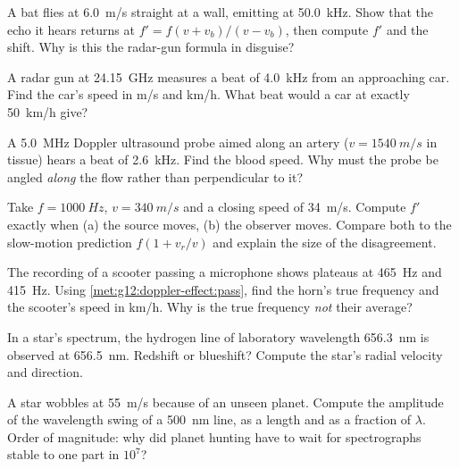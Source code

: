 \begin{exercise}[$\star\star$]\label{exo:g12:doppler-effect:6}
A bat flies at \qty{6.0}{m/s} straight at a wall, emitting at \qty{50.0}{kHz}. Show that
the echo it hears returns at $f' = f(v + v_b)/(v - v_b)$, then compute $f'$ and the shift.
Why is this the radar-gun formula in disguise?
\end{exercise}

\begin{exercise}[$\star\star$]\label{exo:g12:doppler-effect:7}
A radar gun at \qty{24.15}{GHz} measures a beat of \qty{4.0}{kHz} from an approaching car.
Find the car's speed in \unit{m/s} and \unit{km/h}. What beat would a car at exactly
\qty{50}{km/h} give?
\end{exercise}

\begin{exercise}[$\star\star$]\label{exo:g12:doppler-effect:8}
A \qty{5.0}{MHz} Doppler ultrasound probe aimed along an artery ($v = \qty{1540}{m/s}$ in
tissue) hears a beat of \qty{2.6}{kHz}. Find the blood speed. Why must the probe be angled
\emph{along} the flow rather than perpendicular to it?
\end{exercise}

\begin{exercise}[$\star\star$]\label{exo:g12:doppler-effect:9}
Take $f = \qty{1000}{Hz}$, $v = \qty{340}{m/s}$ and a closing speed of \qty{34}{m/s}.
Compute $f'$ exactly when (a) the source moves, (b) the observer moves. Compare both to
the slow-motion prediction $f(1 + v_r/v)$ and explain the size of the disagreement.
\end{exercise}

\begin{exercise}[$\star\star$]\label{exo:g12:doppler-effect:10}
The recording of a scooter passing a microphone shows plateaus at \qty{465}{Hz} and
\qty{415}{Hz}. Using \cref{met:g12:doppler-effect:pass}, find the horn's true frequency and
the scooter's speed in \unit{km/h}. Why is the true frequency \emph{not} their average?
\end{exercise}

\begin{exercise}[$\star\star$]\label{exo:g12:doppler-effect:11}
In a star's spectrum, the hydrogen line of laboratory wavelength \qty{656.3}{nm} is observed
at \qty{656.5}{nm}. Redshift or blueshift? Compute the star's radial velocity and direction.
\end{exercise}

\begin{exercise}[$\star\star\star$]\label{exo:g12:doppler-effect:12}
A star wobbles at \qty{55}{m/s} because of an unseen planet. Compute the amplitude of the
wavelength swing of a \qty{500}{nm} line, as a length and as a fraction of $\lambda$. Order
of magnitude: why did planet hunting have to wait for spectrographs stable to one part in
$10^{7}$?
\end{exercise}

